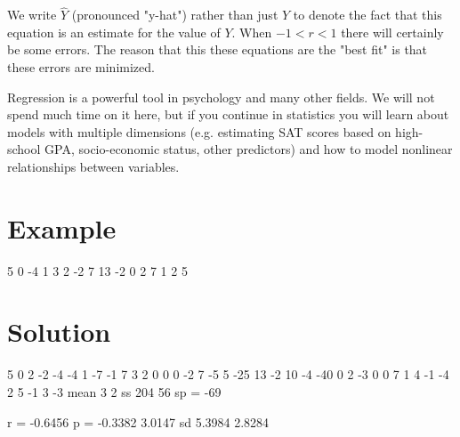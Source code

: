 \documentclass{tufte-handout}
\begin{document}
We write $\hat{Y}$ (pronounced "y-hat") rather than just $Y$ to denote the fact that this equation is an estimate for the value of $Y$. When $-1<r<1$ there will certainly be some errors. The reason that this these equations are the "best fit" is that these errors are minimized.

Regression is a powerful tool in psychology and many other fields. We will not spend much time on it here, but if you continue in statistics you will learn about models with multiple dimensions (e.g. estimating SAT scores based on high-school GPA, socio-economic status, other predictors) and how to model nonlinear relationships between variables.

\pagebreak
\section{Example}

     5     0
    -4     1
     3     2
    -2     7
    13    -2
     0     2
     7     1
     2     5

\pagebreak
\section{Solution}

     5     0     2    -2    -4
    -4     1    -7    -1     7
     3     2     0     0     0
    -2     7    -5     5   -25
    13    -2    10    -4   -40
     0     2    -3     0     0
     7     1     4    -1    -4
     2     5    -1     3    -3
mean   3     2
ss  204    56
sp = -69

r = -0.6456
p = -0.3382    3.0147
sd   5.3984    2.8284
\end{document}
